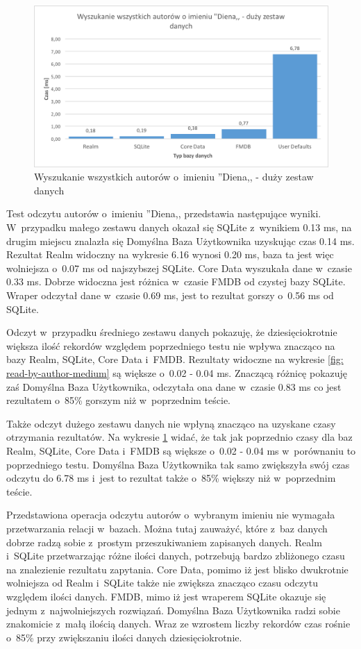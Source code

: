 \begin{figure}[H]
\centering
	\includegraphics[width=15cm]{img/read_data/read_by_authors/read_by_author_big_test.png}
	\caption{Wyszukanie wszystkich autorów o~imieniu ''Diena,, - duży zestaw danych}
	\label{fig: read-by-author-big}
\end{figure}

Test odczytu autorów o~imieniu ''Diena,, przedstawia następujące wyniki. W~przypadku małego zestawu danych okazał się SQLite z~wynikiem 0.13 ms, na drugim miejscu znalazła się Domyślna Baza Użytkownika uzyskując czas 0.14 ms. Rezultat Realm widoczny na wykresie 6.16 wynosi 0.20 ms, baza ta jest więc wolniejsza o~0.07 ms od najszybszej SQLite. Core Data wyszukała dane w~czasie 0.33 ms. Dobrze widoczna jest różnica w~czasie FMDB od czystej bazy SQLite. Wraper odczytał dane w~czasie 0.69 ms, jest to rezultat gorszy o~0.56 ms od SQLite. 

Odczyt w~przypadku średniego zestawu danych pokazuję, że dziesięciokrotnie większa ilość rekordów względem poprzedniego testu  nie wpływa znacząco na bazy Realm, SQLite, Core Data i~FMDB. Rezultaty widoczne na wykresie \ref{fig: read-by-author-medium} są większe o~0.02 - 0.04 ms. Znaczącą różnicę pokazuję zaś Domyślna Baza Użytkownika, odczytała ona dane w~czasie 0.83 ms co jest rezultatem o~85\% gorszym niż w~poprzednim teście. 

Także odczyt dużego zestawu danych nie wpłyną znacząco na uzyskane czasy otrzymania rezultatów. Na wykresie \ref{fig: read-by-author-big} widać, że tak jak poprzednio czasy dla baz Realm, SQLite, Core Data i~FMDB są większe o~0.02 - 0.04 ms w~porównaniu to poprzedniego testu. Domyślna Baza Użytkownika tak samo zwiększyła swój czas odczytu do 6.78 ms i~jest to rezultat także o~85\% większy niż w~poprzednim teście. 

Przedstawiona operacja odczytu autorów o~wybranym imieniu nie wymagała przetwarzania relacji w~bazach. Można tutaj zauważyć, które z~baz danych dobrze radzą sobie z~prostym przeszukiwaniem zapisanych danych. Realm i~SQLite przetwarzając różne ilości danych, potrzebują bardzo zbliżonego czasu na znalezienie rezultatu zapytania. Core Data, pomimo iż jest blisko dwukrotnie wolniejsza od Realm i~SQLite także nie zwiększa znacząco czasu odczytu względem ilości danych. FMDB, mimo iż jest wraperem SQLite okazuje się jednym z~najwolniejszych rozwiązań. Domyślna Baza Użytkownika radzi sobie znakomicie z~małą ilością danych. Wraz ze wzrostem liczby rekordów czas rośnie o~85\% przy zwiększaniu ilości danych dziesięciokrotnie.

